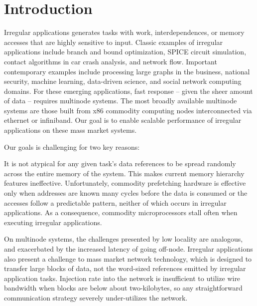 \section{Introduction} \label{sec:intro}

Irregular applications generates tasks with work, interdependences, or memory
accesses that are highly sensitive to input. Classic examples of irregular
applications include branch and bound optimization, SPICE circuit simulation,
contact algorithms in car crash analysis, and network flow. Important
contemporary examples include processing large graphs in the business,
national security, machine learning, data-driven science, and social network
computing domains. For these emerging applications, fast response -- given the
sheer amount of data -- requires multinode systems. The most broadly available
multinode systems are those built from x86 commodity computing nodes
interconnected via ethernet or infiniband. Our goal is to enable scalable
performance of irregular applications on these mass market systems.

Our goals is challenging for two key reasons: 

 It is
not atypical for any given task's data references to be spread randomly across
the entire memory of the system. This makes current memory hierarchy features
ineffective. Unfortunately, commodity prefetching hardware is effective only
when addresses are known many cycles before the data is consumed or the
accesses follow a predictable pattern, neither of which occurs in irregular
applications. As a consequence, commodity microprocessors stall often when
executing irregular applications.



 On multinode systems, the challenges presented by low
locality are analogous, and exacerbated by the increased latency of going
off-node. Irregular applications also present a challenge to mass market
network technology, which is designed to transfer large blocks of data, not
the word-sized references emitted by irregular application tasks. Injection
rate into the network is insufficient to utilize wire bandwidth when blocks
are below about two-kilobytes, so any straightforward communication strategy
severely under-utilizes the network. 

